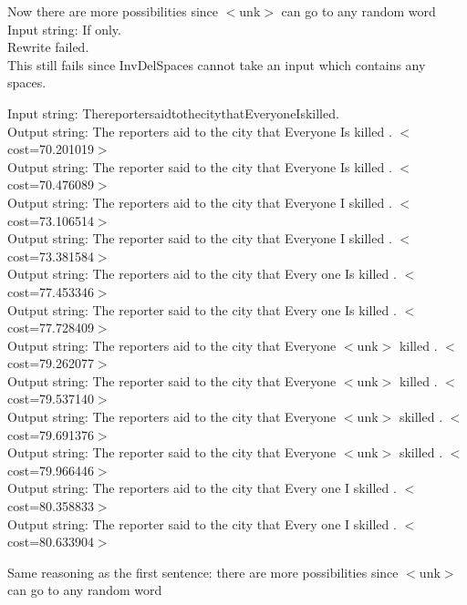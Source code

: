 \documentclass[11pt]{article} %
\begin{document}
Now there are more possibilities since $<$unk$>$ can go to any random word\\

Input string: If only.\\
Rewrite failed.\\

This still fails since InvDelSpaces cannot take an input which contains any spaces.\\

\newpage

Input string: ThereportersaidtothecitythatEveryoneIskilled.\\
Output string: The reporters aid to the city that Everyone Is killed . $<$cost=70.201019$>$\\
Output string: The reporter said to the city that Everyone Is killed . $<$cost=70.476089$>$\\
Output string: The reporters aid to the city that Everyone I skilled . $<$cost=73.106514$>$\\
Output string: The reporter said to the city that Everyone I skilled . $<$cost=73.381584$>$\\
Output string: The reporters aid to the city that Every one Is killed . $<$cost=77.453346$>$\\
Output string: The reporter said to the city that Every one Is killed . $<$cost=77.728409$>$\\
Output string: The reporters aid to the city that Everyone $<$unk$>$ killed . $<$cost=79.262077$>$\\
Output string: The reporter said to the city that Everyone $<$unk$>$ killed . $<$cost=79.537140$>$\\
Output string: The reporters aid to the city that Everyone $<$unk$>$ skilled . $<$cost=79.691376$>$\\
Output string: The reporter said to the city that Everyone $<$unk$>$ skilled . $<$cost=79.966446$>$\\
Output string: The reporters aid to the city that Every one I skilled . $<$cost=80.358833$>$\\
Output string: The reporter said to the city that Every one I skilled . $<$cost=80.633904$>$

Same reasoning as the first sentence: there are more possibilities since $<$unk$>$ can go to any random word\\
\end{document}
